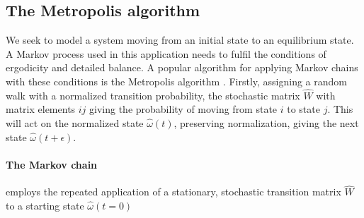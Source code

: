 \documentclass[10pt,a4paper]{article}
\begin{document}
\subsection{The Metropolis algorithm}
We seek to model a system moving from an initial state to an equilibrium state. A Markov process used in this application needs to fulfil the conditions of ergodicity and detailed balance. A popular algorithm for applying Markov chains with these conditions is the Metropolis algorithm \cite{Lecture_Notes_Fall_2015}. Firstly, assigning a random walk with a normalized transition probability, the stochastic matrix $\hat{W}$ with matrix elements $ij$ giving the probability of moving from state $i$ to state $j$. This will act on the normalized state $\hat{\omega}(t)$, preserving normalization, giving the next state $\hat{\omega}(t+\epsilon)$.
\paragraph{The Markov chain}employs the repeated application of a stationary, stochastic transition matrix $\hat{W}$ to a starting state $\hat{\omega}(t=0)$
\end{document}

